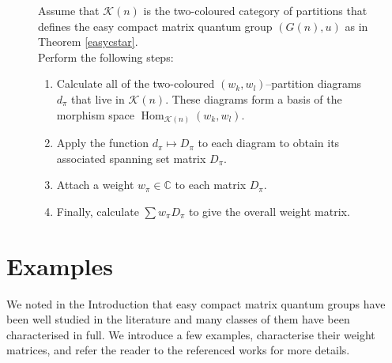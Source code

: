 \documentclass{article}
\DeclareMathOperator{\Hom}{Hom}
\theoremstyle{plain}
\theoremstyle{definition}
\theoremstyle{remark}
\begin{document}

\begin{figure}[tb]
	\begin{tcolorbox}[colback=teal!10, colframe=teal!30, coltitle=black, 
		title={\bfseries Procedure 1: How to Calculate
		the Weight Matrix of
		an Equivariant Linear Layer Function from 
		$((\mathbb{C}^{n})^{\otimes k}, u^{\otimes w_{k}})
		\rightarrow 
		((\mathbb{C}^{n})^{\otimes l}, u^{\otimes w_{l}})$
		for an Easy Compact Matrix Quantum Group $(G(n), u)$.},
	fonttitle=\bfseries]
	Assume that 
		$\mathcal{K}(n)$
		is
		the two-coloured category of partitions 
		that defines the easy compact matrix quantum group $(G(n), u)$ as
		in Theorem \ref{easycstar}. \\

		Perform the following steps:
	\begin{enumerate}
		\item Calculate all of the two-coloured $(w_k, w_l)$--partition diagrams
			$d_\pi$ that live in $\mathcal{K}(n)$.
			These diagrams form a basis of the morphism space $\Hom_{\mathcal{K}(n)}(w_k,w_l)$.
	\item Apply the function $d_\pi \mapsto D_\pi$ to 
		each diagram to obtain its associated spanning set matrix $D_\pi$.
	\item Attach a weight $w_\pi \in \mathbb{C}$ to each matrix $D_\pi$.
	\item Finally, calculate $\sum w_\pi D_\pi$ to give the overall weight matrix.
	\end{enumerate}
	\end{tcolorbox}
  	\label{qgroupsummaryprocedure}
\end{figure}

\section{Examples} \label{CMQGExamples}

We noted in the Introduction that 
easy compact matrix quantum groups have been well studied in the literature
and many classes of them have been characterised in full.
We introduce a few examples, 
characterise their weight matrices,
and refer the reader to the referenced works for more details.
\end{document}
